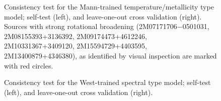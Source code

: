 \documentclass[preprint]{aastex62}
\begin{document}

\newpage

\begin{figure}[ht]
\caption{Consistency test for the Mann-trained temperature/metallicity type model; self-test (left), and leave-one-out cross validation (right). Sources with strong rotational broadening (2M07171706−0501031, 2M08155393+3136392, 2M09174473+4612246, 2M10331367+3409120, 2M15594729+4403595, 2M13400879+4346380), as identified by visual inspection are marked with red circles.} \label{fig:mann_validation}
\end{figure}

\begin{figure}[ht]
\begin{center}
\end{center}
\caption{Consistency test for the West-trained spectral type model; self-test (left), and leave-one-out cross validation (right).} \label{fig:west_validation}
\end{figure}
\end{document}

